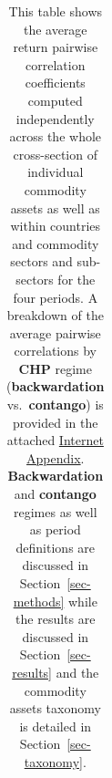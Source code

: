 \documentclass[
  authoryear,
  preprint,
  3p]{elsarticle}
\begin{document}
\begin{longtable}[t]{>{}l>{}l>{}l>{}r>{}r>{}r>{}r}

\caption{\label{tbl-correlations-inner-periods}This table shows the
average return pairwise correlation coefficients computed independently
across the whole cross-section of individual commodity assets as well as
within countries and commodity sectors and sub-sectors for the four
periods. A breakdown of the average pairwise correlations by
\textbf{CHP} regime (\textbf{backwardation} vs.~\textbf{contango}) is
provided in the attached
\href{https://bautheac.shinyapps.io/co-movement/}{Internet Appendix}.
\textbf{Backwardation} and \textbf{contango} regimes as well as period
definitions are discussed in Section~\ref{sec-methods} while the results
are discussed in Section~\ref{sec-results} and the commodity assets
taxonomy is detailed in Section~\ref{sec-taxonomy}.}

\tabularnewline


\end{longtable}
\end{document}
